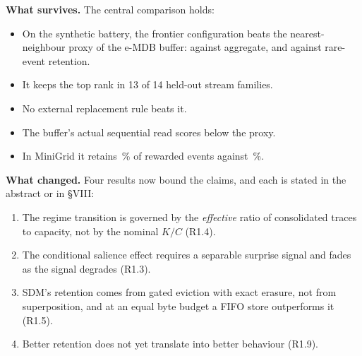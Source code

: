 \documentclass[11pt]{article}
\begin{document}
\textbf{What survives.} The central comparison holds:
\begin{itemize}
\item On the synthetic battery, the frontier configuration beats the
nearest-neighbour proxy of the e-MDB buffer:
 against
 aggregate, and
 against
 rare-event retention.
\item It keeps the top rank in 13 of 14 held-out stream families.
\item No external replacement rule beats it.
\item The buffer's actual sequential read scores below the proxy.
\item In MiniGrid it retains
\,\%
of rewarded events against
\,\%.
\end{itemize}

\textbf{What changed.} Four results now bound the claims, and each is stated in the abstract or in §VIII:
\begin{enumerate}
\item The regime transition is governed by the \emph{effective} ratio of
consolidated traces to capacity, not by the nominal $K/C$ (R1.4).
\item The conditional salience effect requires a separable surprise signal and
fades as the signal degrades (R1.3).
\item SDM's retention comes from gated eviction with exact erasure, not from
superposition, and at an equal byte budget a FIFO store outperforms it (R1.5).
\item Better retention does not yet translate into better behaviour (R1.9).
\end{enumerate}
\end{document}
